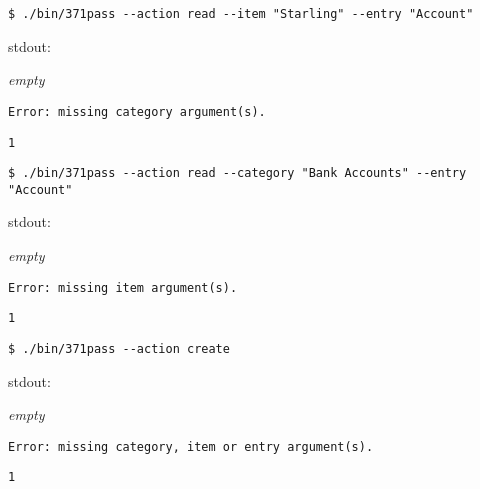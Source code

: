 \documentclass[a4paper]{article}
\begin{document}
\begin{Verbatim}[formatcom=\bfseries]
$ ./bin/371pass --action read --item "Starling" --entry "Account" 
\end{Verbatim}
\begin{labeling}{ stdout:}
    \item[stdout:]
    \emph{empty}
    
    \item[stderr:]
    \begin{lstlisting}[backgroundcolor = \color{lightgray},belowskip=0pt]
Error: missing category argument(s).
    \end{lstlisting}
    
    \item[exit:]
    \texttt{1}
\end{labeling}

\begin{Verbatim}[formatcom=\bfseries]
$ ./bin/371pass --action read --category "Bank Accounts" --entry "Account" 
\end{Verbatim}
\begin{labeling}{ stdout:}
    \item[stdout:]
    \emph{empty}
    
    \item[stderr:]
    \begin{lstlisting}[backgroundcolor = \color{lightgray},belowskip=0pt]
Error: missing item argument(s).
    \end{lstlisting}
    
    \item[exit:]
    \texttt{1}
\end{labeling}

\begin{Verbatim}[formatcom=\bfseries]
$ ./bin/371pass --action create
\end{Verbatim}
\begin{labeling}{ stdout:}
    \item[stdout:]
    \emph{empty}
    
    \item[stderr:]
    \begin{lstlisting}[backgroundcolor = \color{lightgray},belowskip=0pt]
Error: missing category, item or entry argument(s).
    \end{lstlisting}
    
    \item[exit:]
    \texttt{1}
\end{labeling}
\end{document}
